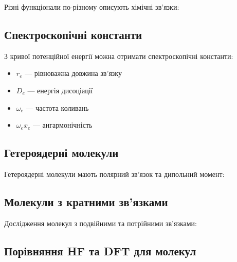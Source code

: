 Різні функціонали по-різному описують хімічні зв'язки:


\subsection{Спектроскопічні константи}

З кривої потенційної енергії можна отримати спектроскопічні константи:

\begin{itemize}
    \item $r_e$ --- рівноважна довжина зв'язку
    \item $D_e$ --- енергія дисоціації
    \item $\omega_e$ --- частота коливань
    \item $\omega_e x_e$ --- ангармонічність
\end{itemize}


\subsection{Гетероядерні молекули}

Гетероядерні молекули мають полярний зв'язок та дипольний момент:


\subsection{Молекули з кратними зв'язками}

Дослідження молекул з подвійними та потрійними зв'язками:


\subsection{Порівняння HF та DFT для молекул}

